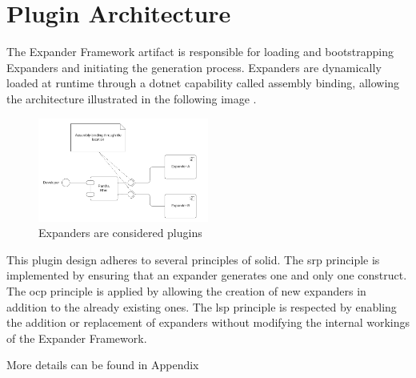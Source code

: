\section{Plugin Architecture} \label{subsec_plugin_architecture}

The Expander Framework artifact is responsible for loading and bootstrapping Expanders and
initiating the generation process. Expanders are dynamically loaded at runtime through a
dotnet capability called assembly binding, allowing the architecture illustrated in the
following image \parencite{koks_expanderpluginloaderinteractor_2023}.

\begin{figure}[H]
  \centering
  \includegraphics[width=0.5\textwidth]{figures/plugin_architecture.pdf}
  \caption[Plugin Archticture]{Expanders are considered plugins}
  \label{fi:plugin_architecture}
\end{figure}

This plugin design adheres to several principles of \gls{solid}. The \gls{srp} principle
is implemented by ensuring that an expander generates one and only one construct. The
\gls{ocp} principle is applied by allowing the creation of new expanders in addition to
the already existing ones. The \gls{lsp} principle is respected by enabling the addition
or replacement of expanders without modifying the internal workings of the Expander
Framework.

More details can be found in Appendix 
